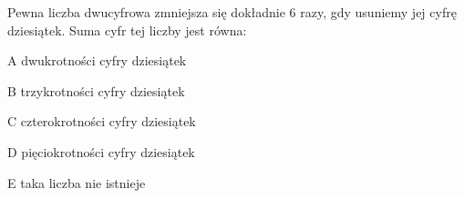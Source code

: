\begin{tresc}
Pewna liczba dwucyfrowa zmniejsza się dokładnie 6 razy, gdy usuniemy jej cyfrę dziesiątek. Suma cyfr tej liczby jest równa:
\end{tresc}
\begin{wariant}{A} dwukrotności cyfry dziesiątek \end{wariant}
\begin{wariant}{B} trzykrotności cyfry dziesiątek \end{wariant}
\begin{wariant}{C} czterokrotności cyfry dziesiątek \end{wariant}
\begin{wariant}{D} pięciokrotności cyfry dziesiątek \end{wariant}
\begin{wariant}{E} taka liczba nie istnieje \end{wariant}

